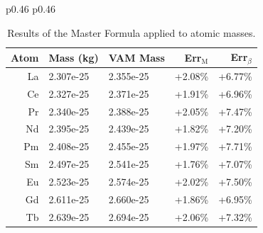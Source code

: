 \documentclass[12pt]{article}
\begin{document}
\begin{table}[htbp]
\scriptsize
\centering
\caption{Results of the Master Formula applied to atomic masses.}
\label{tab:vam_mass_dot_postfix2}
\begin{tabular}{p{0.46\linewidth} p{0.46\linewidth}}

\begin{tabular}{|rllrr|}
\toprule
Atom & Mass (kg) & VAM Mass & Err$_\text{M}$ & Err$_\beta$ \\
\midrule
La  & 2.307e-25 & 2.355e-25     & +2.08\% \tikz[baseline=-0.5ex]{\node[draw=none,fill=green,circle,inner sep=3pt]{};}          & +6.77\% \tikz[baseline=-0.5ex]{\node[draw=none,fill=orange,circle,inner sep=3pt]{};}  \\
Ce  & 2.327e-25 & 2.371e-25     & +1.91\% \tikz[baseline=-0.5ex]{\node[draw=none,fill=green,circle,inner sep=3pt]{};}          & +6.96\% \tikz[baseline=-0.5ex]{\node[draw=none,fill=orange,circle,inner sep=3pt]{};}  \\
Pr  & 2.340e-25 & 2.388e-25     & +2.05\% \tikz[baseline=-0.5ex]{\node[draw=none,fill=green,circle,inner sep=3pt]{};}          & +7.47\% \tikz[baseline=-0.5ex]{\node[draw=none,fill=orange,circle,inner sep=3pt]{};}  \\
Nd  & 2.395e-25 & 2.439e-25     & +1.82\% \tikz[baseline=-0.5ex]{\node[draw=none,fill=green,circle,inner sep=3pt]{};}          & +7.20\% \tikz[baseline=-0.5ex]{\node[draw=none,fill=orange,circle,inner sep=3pt]{};}  \\
Pm  & 2.408e-25 & 2.455e-25     & +1.97\% \tikz[baseline=-0.5ex]{\node[draw=none,fill=green,circle,inner sep=3pt]{};}          & +7.71\% \tikz[baseline=-0.5ex]{\node[draw=none,fill=orange,circle,inner sep=3pt]{};}  \\
Sm  & 2.497e-25 & 2.541e-25     & +1.76\% \tikz[baseline=-0.5ex]{\node[draw=none,fill=green,circle,inner sep=3pt]{};}          & +7.07\% \tikz[baseline=-0.5ex]{\node[draw=none,fill=orange,circle,inner sep=3pt]{};}  \\
Eu  & 2.523e-25 & 2.574e-25     & +2.02\% \tikz[baseline=-0.5ex]{\node[draw=none,fill=green,circle,inner sep=3pt]{};}          & +7.50\% \tikz[baseline=-0.5ex]{\node[draw=none,fill=orange,circle,inner sep=3pt]{};}  \\
Gd  & 2.611e-25 & 2.660e-25     & +1.86\% \tikz[baseline=-0.5ex]{\node[draw=none,fill=green,circle,inner sep=3pt]{};}          & +6.95\% \tikz[baseline=-0.5ex]{\node[draw=none,fill=orange,circle,inner sep=3pt]{};}  \\
Tb  & 2.639e-25 & 2.694e-25     & +2.06\% \tikz[baseline=-0.5ex]{\node[draw=none,fill=green,circle,inner sep=3pt]{};}          & +7.32\% \tikz[baseline=-0.5ex]{\node[draw=none,fill=orange,circle,inner sep=3pt]{};}  \\

\end{tabular}
\end{tabular}
\end{table}
\end{document}
